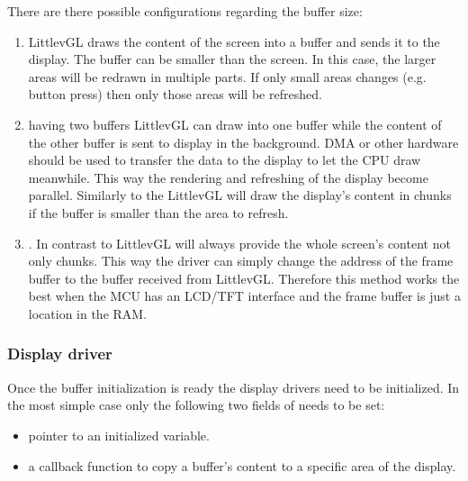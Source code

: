 \documentclass[letterpaper,10pt,english]{sphinxmanual}
\begin{document}
There are there possible configurations regarding the buffer size:
\begin{enumerate}
\def\theenumi{\arabic{enumi}}
\def\labelenumi{\theenumi .}
\makeatletter\def\p@enumii{\p@enumi \theenumi .}\makeatother
\item {} 
 LittlevGL draws the content of the screen into a buffer and sends it to the display.
The buffer can be smaller than the screen. In this case, the larger areas will be redrawn in multiple parts.
If only small areas changes (e.g. button press) then only those areas will be refreshed.

\item {} 
 having two buffers LittlevGL can draw into one buffer while the content of the other buffer is sent to display in the background.
DMA or other hardware should be used to transfer the data to the display to let the CPU draw meanwhile.
This way the rendering and refreshing of the display become parallel.
Similarly to the  LittlevGL will draw the display’s content in chunks if the buffer is smaller than the area to refresh.

\item {} 
.
In contrast to  LittlevGL will always provide the whole screen’s content not only chunks.
This way the driver can simply change the address of the frame buffer to the buffer received from LittlevGL.
Therefore this method works the best when the MCU has an LCD/TFT interface and the frame buffer is just a location in the RAM.

\end{enumerate}


\subsubsection{Display driver}
\label{\detokenize{porting/display:display-driver}}
Once the buffer initialization is ready the display drivers need to be initialized. In the most simple case only the following two fields of  needs to be set:
\begin{itemize}
\item {} 
 pointer to an initialized  variable.

\item {} 
 a callback function to copy a buffer’s content to a specific area of the display.

\end{itemize}
\end{document}
